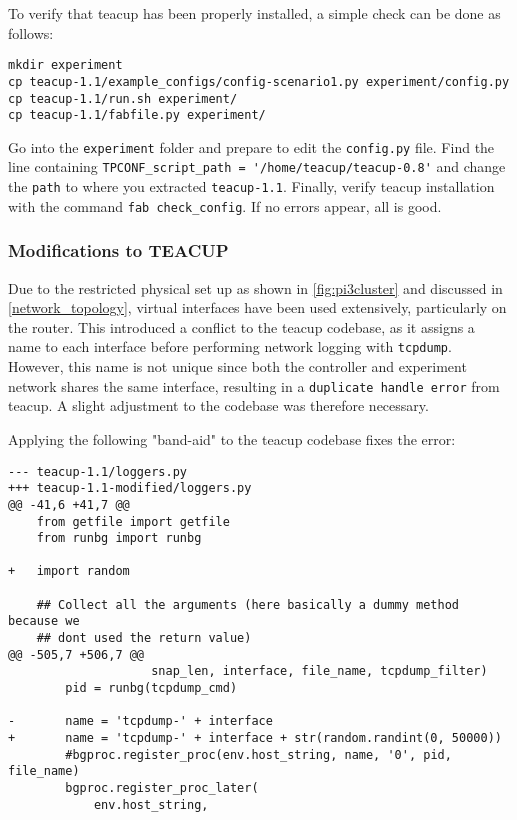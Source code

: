 To verify that \gls{teacup} has been properly installed, a simple check can be done as follows:

\begin{verbatim}
mkdir experiment
cp teacup-1.1/example_configs/config-scenario1.py experiment/config.py
cp teacup-1.1/run.sh experiment/
cp teacup-1.1/fabfile.py experiment/
\end{verbatim}

Go into the \lstinline{experiment} folder and prepare to edit the \lstinline{config.py} file. Find the line containing \lstinline{TPCONF_script_path = '/home/teacup/teacup-0.8'} and change the \lstinline{path} to where you extracted \lstinline{teacup-1.1}. Finally, verify \gls{teacup} installation with the command \lstinline{fab check_config}. If no errors appear, all is good.


\subsubsection{Modifications to TEACUP}

Due to the restricted physical set up as shown in \ref{fig:pi3cluster} and discussed in \ref{network_topology}, virtual interfaces have been used extensively, particularly on the router. This introduced a conflict to the \gls{teacup} codebase, as it assigns a name to each interface before performing network logging with \lstinline{tcpdump}. However, this name is not unique since both the controller and experiment network shares the same interface, resulting in a \lstinline{duplicate handle error} from \gls{teacup}. A slight adjustment to the codebase was therefore necessary.

Applying the following "band-aid" to the \gls{teacup} codebase fixes the error:

\begin{verbatim}
--- teacup-1.1/loggers.py
+++ teacup-1.1-modified/loggers.py
@@ -41,6 +41,7 @@
    from getfile import getfile
    from runbg import runbg
    
+   import random
    
    ## Collect all the arguments (here basically a dummy method because we
    ## dont used the return value)
@@ -505,7 +506,7 @@
                    snap_len, interface, file_name, tcpdump_filter)
        pid = runbg(tcpdump_cmd)
    
-       name = 'tcpdump-' + interface
+       name = 'tcpdump-' + interface + str(random.randint(0, 50000))
        #bgproc.register_proc(env.host_string, name, '0', pid, file_name)
        bgproc.register_proc_later(
            env.host_string,
\end{verbatim}

